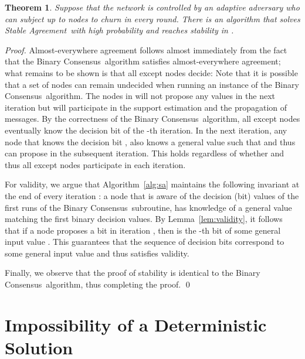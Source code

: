 \documentclass[leqno,11pt]{article}
\newtheorem{theorem}{Theorem}[section]
\newcommand{\sa}{{\sc Stable Agreement}}
\newcommand{\bc}{{\sc Binary Consensus}}
\begin{document}
\begin{theorem} \label{thm:adaptiveSA}
  Suppose that the network is controlled by an adaptive adversary who can
  subject up to  nodes to churn in every round.
  There is an algorithm that solves \sa\ with high probability and reaches stability in .
\end{theorem}
\begin{proof}
  Almost-everywhere agreement follows almost immediately from the fact that the \bc\ algorithm satisfies almost-everywhere agreement; what remains to be shown is that all except  nodes decide:
  Note that it is possible that a set  of  nodes can remain undecided when running an instance of the \bc\ algorithm.
  The nodes in  will not propose any values in the next iteration but will participate in the support estimation and the propagation of messages.
  By the correctness of the \bc\ algorithm, all except  nodes eventually know the decision bit  of the -th iteration.
  In the next iteration, any node  that knows the decision bit , also knows a general value  such that  and thus can propose in the subsequent iteration.
  This holds regardless of whether  and thus all except  nodes participate in each iteration.

  For validity, we argue that Algorithm~\ref{alg:sa} maintains the following invariant at the end of every iteration : a node that is aware of the decision (bit) values of the first  runs of the \bc\ subroutine, has knowledge of a general value matching the first  binary decision values.
  By Lemma~\ref{lem:validity}, it follows that if a node  proposes a bit  in iteration , then  is the -th bit of some general input value .
  This guarantees that the sequence of decision bits correspond to some general input value and thus satisfies validity.

  Finally, we observe that the proof of stability is identical to the \bc\ algorithm, thus completing the proof.
  \qed
\end{proof}





\section{Impossibility of a Deterministic Solution} \label{sec:impossibility}
\end{document}
